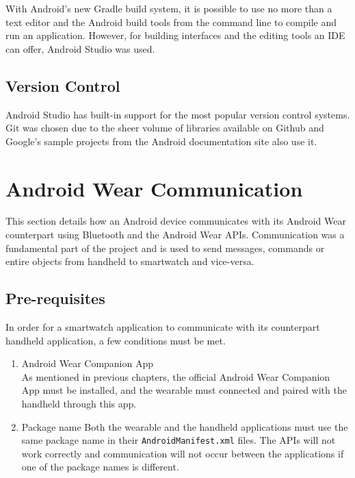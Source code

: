 With Android's new Gradle build system, it is possible to use no more than a
text editor and the Android build tools from the command line to compile and
run an application. However, for building interfaces and the editing tools
an IDE can offer, Android Studio was used.

\subsection{Version Control}
Android Studio has built-in support for the most popular version control
systems. Git was chosen due to the sheer volume of libraries available on Github
and Google's sample projects from the Android documentation site also use it.


\section{Android Wear Communication}

This section details how an Android device communicates with its Android Wear
counterpart using Bluetooth and the Android Wear APIs. Communication was a
fundamental part of the project and is used to send messages, commands or entire
objects from handheld to smartwatch and vice-versa.

\subsection{Pre-requisites}
In order for a smartwatch application to communicate with its counterpart
handheld application, a few conditions must be met.

\begin{enumerate}
\item Android Wear Companion App\\
    As mentioned in previous chapters, the official Android Wear Companion App
    must be installed, and the wearable must connected and paired with the
    handheld through this app.
\item Package name
    Both the wearable and the handheld applications must use the same package
    name in their \texttt{AndroidManifest.xml} files. The APIs will not work
    correctly and communication will not occur between the applications if one
    of the package names is different.
\end{enumerate}

